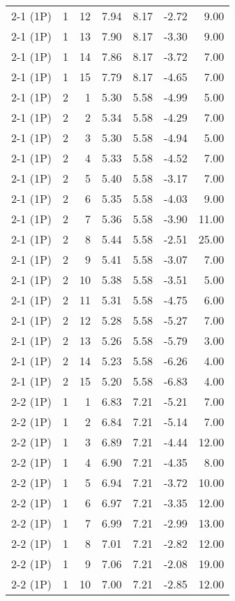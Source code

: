 \begin{tabular}{lrrrrrr}
2-1 (1P) & 1 & 12 & 7.94 & 8.17 & -2.72 & 9.00 \\
2-1 (1P) & 1 & 13 & 7.90 & 8.17 & -3.30 & 9.00 \\
2-1 (1P) & 1 & 14 & 7.86 & 8.17 & -3.72 & 7.00 \\
2-1 (1P) & 1 & 15 & 7.79 & 8.17 & -4.65 & 7.00 \\
2-1 (1P) & 2 & 1 & 5.30 & 5.58 & -4.99 & 5.00 \\
2-1 (1P) & 2 & 2 & 5.34 & 5.58 & -4.29 & 7.00 \\
2-1 (1P) & 2 & 3 & 5.30 & 5.58 & -4.94 & 5.00 \\
2-1 (1P) & 2 & 4 & 5.33 & 5.58 & -4.52 & 7.00 \\
2-1 (1P) & 2 & 5 & 5.40 & 5.58 & -3.17 & 7.00 \\
2-1 (1P) & 2 & 6 & 5.35 & 5.58 & -4.03 & 9.00 \\
2-1 (1P) & 2 & 7 & 5.36 & 5.58 & -3.90 & 11.00 \\
2-1 (1P) & 2 & 8 & 5.44 & 5.58 & -2.51 & 25.00 \\
2-1 (1P) & 2 & 9 & 5.41 & 5.58 & -3.07 & 7.00 \\
2-1 (1P) & 2 & 10 & 5.38 & 5.58 & -3.51 & 5.00 \\
2-1 (1P) & 2 & 11 & 5.31 & 5.58 & -4.75 & 6.00 \\
2-1 (1P) & 2 & 12 & 5.28 & 5.58 & -5.27 & 7.00 \\
2-1 (1P) & 2 & 13 & 5.26 & 5.58 & -5.79 & 3.00 \\
2-1 (1P) & 2 & 14 & 5.23 & 5.58 & -6.26 & 4.00 \\
2-1 (1P) & 2 & 15 & 5.20 & 5.58 & -6.83 & 4.00 \\
2-2 (1P) & 1 & 1 & 6.83 & 7.21 & -5.21 & 7.00 \\
2-2 (1P) & 1 & 2 & 6.84 & 7.21 & -5.14 & 7.00 \\
2-2 (1P) & 1 & 3 & 6.89 & 7.21 & -4.44 & 12.00 \\
2-2 (1P) & 1 & 4 & 6.90 & 7.21 & -4.35 & 8.00 \\
2-2 (1P) & 1 & 5 & 6.94 & 7.21 & -3.72 & 10.00 \\
2-2 (1P) & 1 & 6 & 6.97 & 7.21 & -3.35 & 12.00 \\
2-2 (1P) & 1 & 7 & 6.99 & 7.21 & -2.99 & 13.00 \\
2-2 (1P) & 1 & 8 & 7.01 & 7.21 & -2.82 & 12.00 \\
2-2 (1P) & 1 & 9 & 7.06 & 7.21 & -2.08 & 19.00 \\
2-2 (1P) & 1 & 10 & 7.00 & 7.21 & -2.85 & 12.00 \\

\end{tabular}
